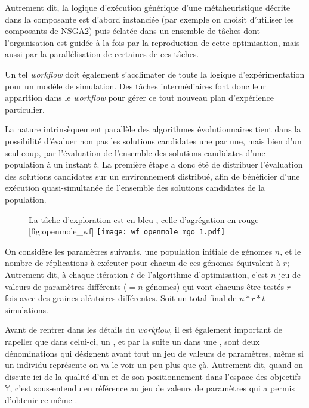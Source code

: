 Autrement dit, la logique d'exécution générique d'une métaheuristique décrite dans la composante  est d'abord instanciée (par exemple on choisit d'utiliser les composants de NSGA2) puis éclatée dans un ensemble de tâches dont l'organisation est guidée à la fois par la reproduction de cette optimisation, mais aussi par la parallélisation de certaines de ces tâches.

Un tel \textit{workflow} doit également s'acclimater de toute la logique d'expérimentation pour un modèle de simulation. Des tâches intermédiaires font donc leur apparition dans le \textit{workflow} pour gérer ce tout nouveau plan d'expérience particulier.

La nature intrinsèquement parallèle des algorithmes évolutionnaires tient dans la possibilité d'évaluer non pas les solutions candidates une par une, mais bien d'un seul coup, par l'évaluation de l'ensemble des solutions candidates d'une population à un instant $t$. La première étape a donc été de distribuer l'évaluation des solutions candidates sur un environnement distribué, afin de bénéficier d'une exécution quasi-simultanée de l'ensemble des solutions candidates de la population.

\begin{figure}[H]
	\begin{sidecaption}{La tâche d'exploration est en bleu , celle d'agrégation en rouge }[fig:openmole_wf]
		\centering
		\texttt{[image: wf\_openmole\_mgo\_1.pdf]}{
		}
  \end{sidecaption}
\end{figure}

On considère les paramètres suivants, une population initiale de génomes $n$, et le nombre de réplications à exécuter pour chacun de ces génomes équivalent à $r$; Autrement dit, à chaque itération $t$ de l'algorithme d'optimisation, c'est $n$ jeu de valeurs de paramètres différents ($= n$ génomes) qui vont chacuns être testés $r$ fois avec des graines aléatoires différentes. Soit un total final de $n * r * t$ simulations.

Avant de rentrer dans les détails du \textit{workflow}, il est également important de rapeller que dans celui-ci, un , et par la suite un  dans une , sont deux dénominations qui désignent avant tout un jeu de valeurs de paramètres, même si un individu représente on va le voir un peu plus que çà. Autrement dit, quand on discute ici de la qualité d'un  et de son positionnement dans l'espace des objectifs $\mathbb{Y}$, c'est sous-entendu en référence au jeu de valeurs de paramètres qui a permis d'obtenir ce même .

